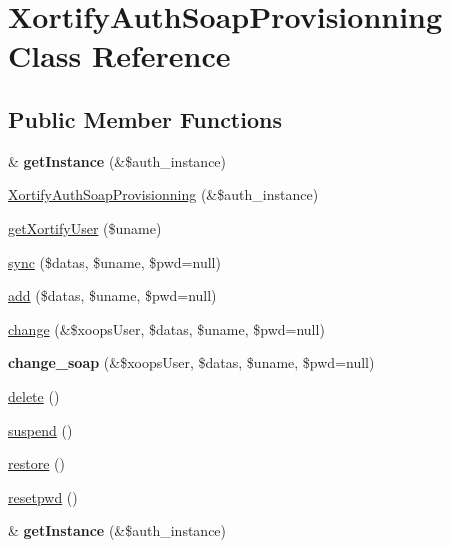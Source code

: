 \hypertarget{class_xortify_auth_soap_provisionning}{\section{Xortify\-Auth\-Soap\-Provisionning Class Reference}
\label{class_xortify_auth_soap_provisionning}
}
\subsection*{Public Member Functions}
\begin{DoxyCompactItemize}
\item 
\hypertarget{class_xortify_auth_soap_provisionning_a2c8eaa915c70d75289ac8a03686194f9}{\& {\bfseries get\-Instance} (\&\$auth\-\_\-instance)}\label{class_xortify_auth_soap_provisionning_a2c8eaa915c70d75289ac8a03686194f9}

\item 
\hyperlink{class_xortify_auth_soap_provisionning_a8b92f1ad88521a50ccad3531e57bafef}{Xortify\-Auth\-Soap\-Provisionning} (\&\$auth\-\_\-instance)
\item 
\hyperlink{class_xortify_auth_soap_provisionning_a041d726ac26672547ed1504e8e0117aa}{get\-Xortify\-User} (\$uname)
\item 
\hyperlink{class_xortify_auth_soap_provisionning_a35dc08b0f2138eb818ff95345b73bcff}{sync} (\$datas, \$uname, \$pwd=null)
\item 
\hyperlink{class_xortify_auth_soap_provisionning_adfc9fcef01e7bd7b2f47e8e79d51fc63}{add} (\$datas, \$uname, \$pwd=null)
\item 
\hyperlink{class_xortify_auth_soap_provisionning_ae1f0971b9712c794620cf309164e43af}{change} (\&\$xoops\-User, \$datas, \$uname, \$pwd=null)
\item 
\hypertarget{class_xortify_auth_soap_provisionning_a6b0d41baa32408f3442dfcfaf7cdc786}{{\bfseries change\-\_\-soap} (\&\$xoops\-User, \$datas, \$uname, \$pwd=null)}\label{class_xortify_auth_soap_provisionning_a6b0d41baa32408f3442dfcfaf7cdc786}

\item 
\hyperlink{class_xortify_auth_soap_provisionning_a13bdffdd926f26b825ea57066334ff01}{delete} ()
\item 
\hyperlink{class_xortify_auth_soap_provisionning_ad73006a505121228f3b075c2409787d2}{suspend} ()
\item 
\hyperlink{class_xortify_auth_soap_provisionning_aa1371f22826cf8cde4454c9b467203d0}{restore} ()
\item 
\hyperlink{class_xortify_auth_soap_provisionning_a06d70fbd3a2db390b6f2530c0076628e}{resetpwd} ()
\item 
\hypertarget{class_xortify_auth_soap_provisionning_a2c8eaa915c70d75289ac8a03686194f9}{\& {\bfseries get\-Instance} (\&\$auth\-\_\-instance)}\label{class_xortify_auth_soap_provisionning_a2c8eaa915c70d75289ac8a03686194f9}


\end{DoxyCompactItemize}
